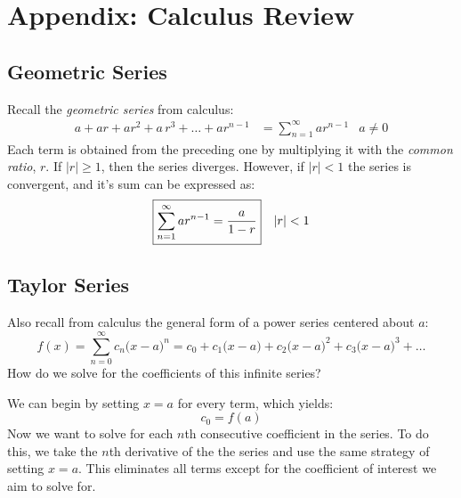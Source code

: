 \chapter{Appendix: Calculus Review}
\label{app:calc}
\section{Geometric Series}
\label{sec:geometric}
Recall the \textit{geometric series} from calculus\cite{stewart}:
    \begin{align}
        a + ar + ar^2 + a\,r^3 + \dots + ar^{n - 1} &= \sum_{n=1}^{\infty} {ar}^{n - 1} &a \ne 0
        \label{eq:geometric_sum}
    \end{align}
Each term is obtained from the preceding one by multiplying it with the \textit{common ratio}, $r$.  If $\left|r\right| \geq 1$, then the series diverges.  However, if $\left|r\right| < 1$ the series is convergent, and it's sum can be expressed as:
    \begin{align}
        \Aboxed{\sum_{n=1}^{\infty} {ar}^{n - 1} &= \frac{a}{1 - r}} &\left|r\right| < 1
        \label{eq:geometric_series}
    \end{align}
\section{Taylor Series}
\label{sec:taylor}
Also recall from calculus\cite{stewart} the general form of a power series centered about $a$:
    \begin{equation}
        f(x) = \sum_{n=0}^{\infty} c_n {\big(x - a\big)}^n = c_0 + c_1{\big(x - a\big)}
            + c_2{\big(x - a\big)}^2 + c_3{\big(x - a\big)}^3 + \dots
        \label{eq:power_series}
    \end{equation}
How do we solve for the coefficients of this infinite series?

\vspace{0.5cm}
\noindent
We can begin by setting $x = a$ for every term, which yields:
    \begin{equation}
        c_0 = f(a)
        \label{eq:power_first}
    \end{equation}
Now we want to solve for each $n$th consecutive coefficient in the series.  To do this, we take the $n$th derivative of the the series and use the same strategy of setting $x = a$.  This eliminates all terms except for the coefficient of interest we aim to solve for.

